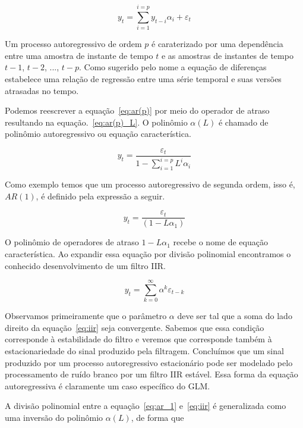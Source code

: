 \begin{equation}\label{eq:ar(p)}
   y_t = \sum^{i=p}_{i=1} y_{t-i} \alpha_i + \varepsilon_t
\end{equation}

Um processo autoregressivo de ordem $p$ é caraterizado por uma dependência
entre uma amostra de instante de tempo $t$ e as amostras de instantes de tempo
$t-1$, $t-2$, ..., $t-p$. Como sugerido pelo nome a equação de diferenças
estabelece uma relação de regressão entre uma série temporal e suas versões
atrasadas no tempo.

Podemos reescrever a equação~\ref{eq:ar(p)} por meio do operador de atraso
resultando na equação.~\ref{eq:ar(p)_L}. O polinômio $\alpha(L)$ é chamado de
polinômio autoregressivo ou equação característica.

\begin{equation}\label{eq:ar(p)_L}
    y_t = \frac{\varepsilon_t}{1 - \sum_{i=1}^{i=p} L^i \alpha_i}
\end{equation}

Como exemplo temos que um processo autoregressivo de segunda ordem, isso é,
$AR(1)$, é definido pela expressão a seguir.

\begin{equation}\label{eq:ar_1}
    y_t = \frac{\varepsilon_t}{(1 - L\alpha_1)}
\end{equation}

O polinômio de operadores de atraso $1 - L\alpha_1$ recebe o nome de equação
característica. Ao expandir essa equação por divisão polinomial encontramos o
conhecido desenvolvimento de um filtro IIR.

\begin{equation}\label{eq:iir}
    y_t = \sum^{\infty}_{k=0} \alpha^k \varepsilon_{t-k}
\end{equation}

Observamos primeiramente que o parâmetro $\alpha$ deve ser tal que a soma do
lado direito da equação~\ref{eq:iir} seja convergente. Sabemos que essa
condição corresponde à estabilidade do filtro e veremos que corresponde também
à estacionariedade do sinal produzido pela filtragem. Concluímos que um sinal
produzido por um processo autoregressivo estacionário pode ser modelado pelo
processamento de ruído branco por um filtro IIR estável. Essa forma da
equação autoregressiva é claramente um caso específico do GLM.

A divisão polinomial entre a equação~\ref{eq:ar_1} e~\ref{eq:iir} é generalizada
como uma inversão do polinômio $\alpha(L)$, de forma que

